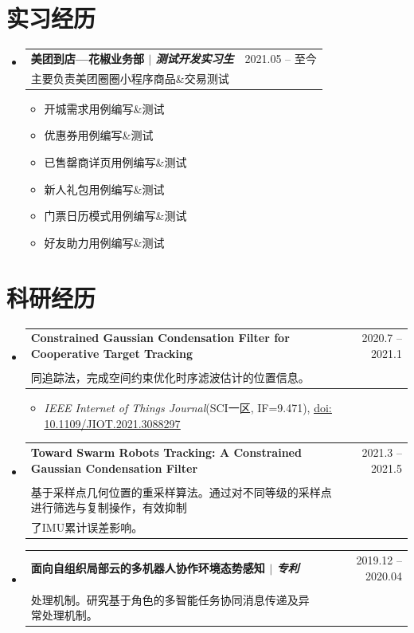 \documentclass[a4paper,11pt]{ctexart}
\makeatletter
\newcommand{\CVItem}[1]{
	\item\small{
		{#1 \vspace{-2pt}}
	}
}
\newcommand{\CVSubheading}[4]{
	\vspace{-2pt}\item
	\begin{tabular*}{0.97\textwidth}[t]{l@{\extracolsep{\fill}}r}
		\textbf{#1} & #2 \\
		\small#3 & \small #4 \\
	\end{tabular*}\vspace{-7pt}
}
\newcommand{\CVSubHeadingListStart}{\begin{itemize}[leftmargin=0.5cm, label={}]}
\newcommand{\CVSubHeadingListEnd}{\end{itemize}}
\newcommand{\CVItemListStart}{\vspace{-4pt}\begin{itemize}}
\newcommand{\CVItemListEnd}{\end{itemize}\vspace{-5pt}}
\makeatother
\begin{document}
	\section{实习经历}
	\CVSubHeadingListStart
	\CVSubheading
	{{美团到店—花椒业务部}  $|$ \emph{\small{测试开发实习生}}}{2021.05 -- 至今}
	{主要负责美团圈圈小程序商品\&交易测试}{}
	\CVItemListStart
	\CVItem{开城需求用例编写\&测试}
	\CVItem{优惠券用例编写\&测试}
	\CVItem{已售罄商详页用例编写\&测试}
	\CVItem{新人礼包用例编写\&测试}
	\CVItem{门票日历模式用例编写\&测试}
	\CVItem{好友助力用例编写\&测试}
	\CVItemListEnd
	
	\CVSubHeadingListEnd
	
	\section{科研经历}
	\CVSubHeadingListStart
	\CVSubheading
	{\small\textbf{Constrained Gaussian Condensation Filter for Cooperative Target Tracking} }{2020.7 -- 2021.1}
	{\makecell[l]{基于时空约束高斯聚合滤波的协同运动追踪。提出一种基于时空约束高斯聚合滤波的多目标协\\
			同追踪法，完成空间约束优化时序滤波估计的位置信息。}}{}
	\CVItemListStart
	\CVItem{\textit{IEEE Internet of Things Journal}(SCI一区, IF=9.471), \href{https://doi.org/10.1109/JIOT.2021.3088297}{\underline{doi: 10.1109/JIOT.2021.3088297}}}
	\CVItemListEnd
	
	\CVSubheading
	{\small\textbf{Toward Swarm Robots Tracking: A Constrained Gaussian Condensation Filter}} {2021.3 -- 2021.5}
	{\makecell[l]{针对目标追踪存在的累计误差问题，根据IMU预估中心以及置信规模，建立误差椭圆，实现\\
			基于采样点几何位置的重采样算法。通过对不同等级的采样点进行筛选与复制操作，有效抑制\\
			了IMU累计误差影响。}}{}
	
	\CVSubheading
	{面向自组织局部云的多机器人协作环境态势感知 $|$ \emph{\small{专利}}}{2019.12 -- 2020.04}
	{\makecell[l]{构建基于角色的多智能体协同模型体系，建立多智能体间通用的分布式自适应的协同任务\\
			处理机制。研究基于角色的多智能任务协同消息传递及异常处理机制。}}{}
	
	\CVSubHeadingListEnd
	
\end{document}
